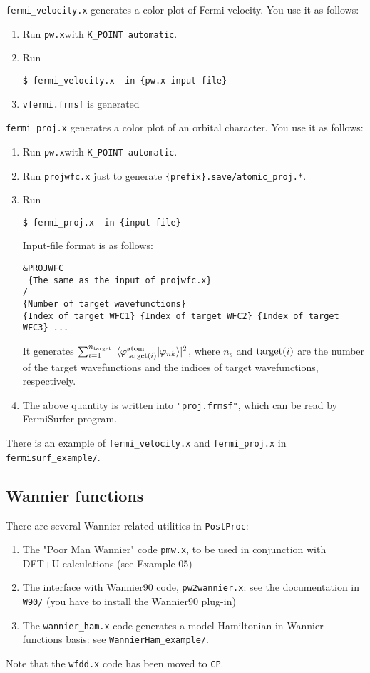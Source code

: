 \documentclass[12pt,a4paper]{article}
\def\pwx{\texttt{pw.x}}
\def\CP{\texttt{CP}}
\def\PostProc{\texttt{PostProc}}
\begin{document}
\verb|fermi_velocity.x| generates a color-plot of Fermi velocity.
You use it as follows:
\begin{enumerate}
\item Run \pwx with \verb|K_POINT automatic|.
\item Run 
\begin{verbatim}
$ fermi_velocity.x -in {pw.x input file}
\end{verbatim}  
\item \verb|vfermi.frmsf| is generated
\end{enumerate}

\verb|fermi_proj.x| generates a color plot of an orbital character.
You use it as follows:
\begin{enumerate}
\item Run \pwx with \verb|K_POINT automatic|.
\item Run \verb|projwfc.x| just to generate \verb|{prefix}.save/atomic_proj.*|.
\item Run 
\begin{verbatim}
$ fermi_proj.x -in {input file}
\end{verbatim}
Input-file format is as follows:
\begin{verbatim}
&PROJWFC
 {The same as the input of projwfc.x}
/
{Number of target wavefunctions}
{Index of target WFC1} {Index of target WFC2} {Index of target WFC3} ...
\end{verbatim}
It generates 
$\sum_{i=1}^{n_{\rm target}} |\langle \varphi_{{\rm target}(i)}^{\rm atom}|\varphi_{n k} \rangle|^2$, 
where $n_s$ and ${\rm target}(i)$ are
the number of the target wavefunctions
and the indices of target wavefunctions, respectively.
\item The above quantity is written into \verb|"proj.frmsf"|,
  which can be read by FermiSurfer program.
\end{enumerate}

There is an example of \verb|fermi_velocity.x| and \verb|fermi_proj.x|
in \verb|fermisurf_example/|.

\subsection{Wannier functions}

There are several Wannier-related utilities in \PostProc:
\begin{enumerate}
\item The "Poor Man Wannier" code \texttt{pmw.x}, to be used
in conjunction with DFT+U calculations (see Example 05)
\item The interface with Wannier90 code, \texttt{pw2wannier.x}:
see the documentation in \texttt{W90/} (you have to install the 
Wannier90 plug-in)
\item The \texttt{wannier\_ham.x} code generates a model Hamiltonian 
in Wannier functions basis: see \texttt{WannierHam\_example/}.
\end{enumerate}
Note that the \texttt{wfdd.x} code has been moved to \CP.
\end{document}
